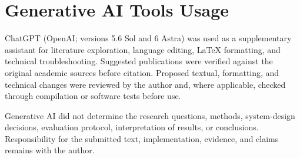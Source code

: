 \chapter{Generative AI Tools Usage}
\label{genAIUsage}

ChatGPT (OpenAI; versions 5.6 Sol and 6 Astra) was used as a supplementary assistant for literature exploration, language editing, \LaTeX{} formatting, and technical troubleshooting. Suggested publications were verified against the original academic sources before citation. Proposed textual, formatting, and technical changes were reviewed by the author and, where applicable, checked through compilation or software tests before use.

Generative AI did not determine the research questions, methods, system-design decisions, evaluation protocol, interpretation of results, or conclusions. Responsibility for the submitted text, implementation, evidence, and claims remains with the author.

